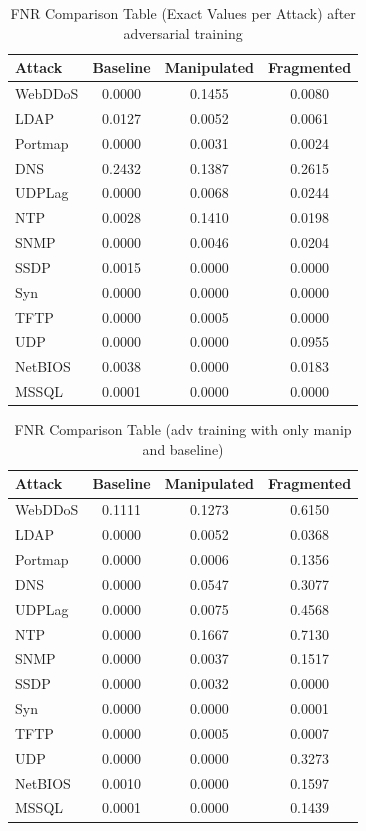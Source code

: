\begin{table}[h]
\centering
\caption{FNR Comparison Table (Exact Values per Attack) after adversarial training}
\begin{tabular}{lccc}
\hline
\textbf{Attack} & \textbf{Baseline} & \textbf{Manipulated} & \textbf{Fragmented} \\
\hline
WebDDoS  & 0.0000 & 0.1455 & 0.0080 \\
LDAP     & 0.0127 & 0.0052 & 0.0061 \\
Portmap  & 0.0000 & 0.0031 & 0.0024 \\
DNS      & 0.2432 & 0.1387 & 0.2615 \\
UDPLag   & 0.0000 & 0.0068 & 0.0244 \\
NTP      & 0.0028 & 0.1410 & 0.0198 \\
SNMP     & 0.0000 & 0.0046 & 0.0204 \\
SSDP     & 0.0015 & 0.0000 & 0.0000 \\
Syn      & 0.0000 & 0.0000 & 0.0000 \\
TFTP     & 0.0000 & 0.0005 & 0.0000 \\
UDP      & 0.0000 & 0.0000 & 0.0955 \\
NetBIOS  & 0.0038 & 0.0000 & 0.0183 \\
MSSQL    & 0.0001 & 0.0000 & 0.0000 \\
\hline
\end{tabular}
\end{table}

\begin{table}[h]
\centering
\caption{FNR Comparison Table (adv training with only manip and baseline)}
\begin{tabular}{lccc}
\hline
\textbf{Attack} & \textbf{Baseline} & \textbf{Manipulated} & \textbf{Fragmented} \\
\hline
WebDDoS  & 0.1111 & 0.1273 & 0.6150 \\
LDAP     & 0.0000 & 0.0052 & 0.0368 \\
Portmap  & 0.0000 & 0.0006 & 0.1356 \\
DNS      & 0.0000 & 0.0547 & 0.3077 \\
UDPLag   & 0.0000 & 0.0075 & 0.4568 \\
NTP      & 0.0000 & 0.1667 & 0.7130 \\
SNMP     & 0.0000 & 0.0037 & 0.1517 \\
SSDP     & 0.0000 & 0.0032 & 0.0000 \\
Syn      & 0.0000 & 0.0000 & 0.0001 \\
TFTP     & 0.0000 & 0.0005 & 0.0007 \\
UDP      & 0.0000 & 0.0000 & 0.3273 \\
NetBIOS  & 0.0010 & 0.0000 & 0.1597 \\
MSSQL    & 0.0001 & 0.0000 & 0.1439 \\
\hline
\end{tabular}
\end{table}